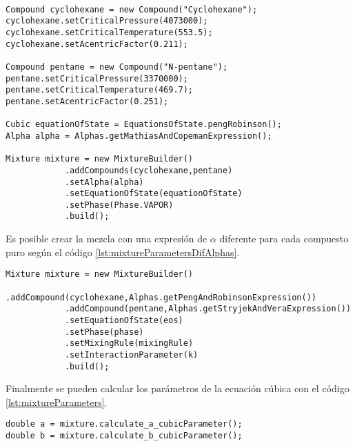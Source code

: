 \begin{lstlisting}[caption={Creación de una mezcla con la clase `MixtureBuilder' asignando la misma expresión de $\alpha$ para cada compuesto puro.}, label={lst:mixturecreation} ]

Compound cyclohexane = new Compound("Cyclohexane");
cyclohexane.setCriticalPressure(4073000);
cyclohexane.setCriticalTemperature(553.5);
cyclohexane.setAcentricFactor(0.211);

Compound pentane = new Compound("N-pentane");
pentane.setCriticalPressure(3370000);
pentane.setCriticalTemperature(469.7);
pentane.setAcentricFactor(0.251);

Cubic equationOfState = EquationsOfState.pengRobinson();
Alpha alpha = Alphas.getMathiasAndCopemanExpression();

Mixture mixture = new MixtureBuilder()
			.addCompounds(cyclohexane,pentane)
			.setAlpha(alpha)
			.setEquationOfState(equationOfState)
			.setPhase(Phase.VAPOR)
			.build();

\end{lstlisting}

Es posible crear la mezcla con una expresión de $\alpha$ diferente para cada compuesto puro según el código \ref{lst:mixtureParametersDifAlphas}. 


\begin{lstlisting}[caption={Código para el cálculo de los parámetros de la ecuación de estado en una mezcla, con diferentes expresiones de $\alpha$},label={lst:mixtureParametersDifAlphas}]
Mixture mixture = new MixtureBuilder()
			.addCompound(cyclohexane,Alphas.getPengAndRobinsonExpression())
			.addCompound(pentane,Alphas.getStryjekAndVeraExpression())
			.setEquationOfState(eos)
			.setPhase(phase)
			.setMixingRule(mixingRule)
			.setInteractionParameter(k)
			.build();
\end{lstlisting}

Finalmente se pueden calcular los parámetros de la ecuación cúbica con el código \ref{lst:mixtureParameters}.

\begin{lstlisting}[caption={Cálculo de parámetros de la mezcla},label={lst:mixtureParameters}]
double a = mixture.calculate_a_cubicParameter();
double b = mixture.calculate_b_cubicParameter();
\end{lstlisting}
